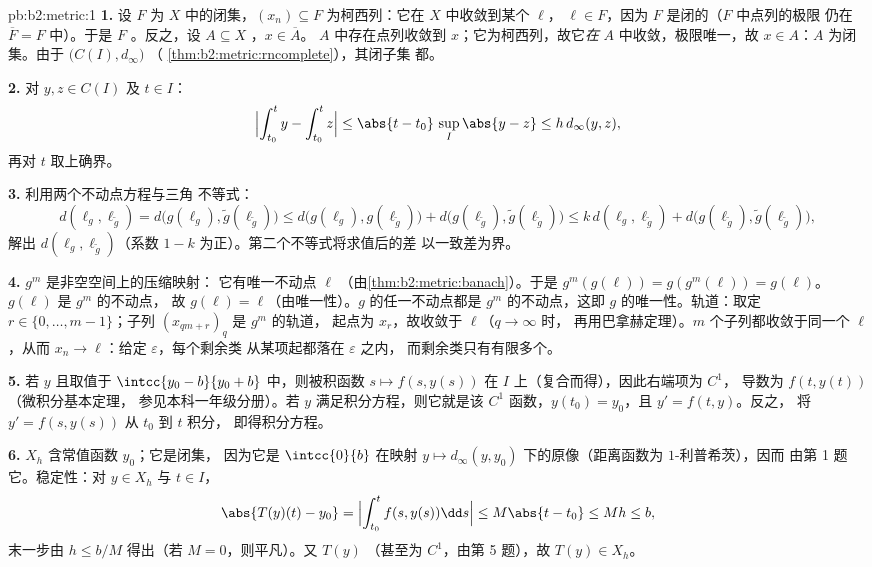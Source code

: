 \begin{solution}{pb:b2:metric:1}
\textbf{1.} 设 $F$ 为 $X$ 中的闭集，$(x_n)
\subseteq F$ 为柯西列：它在 $X$ 中收敛到某个 $\ell$，
$\ell \in F$，因为 $F$ 是闭的（$F$ 中点列的极限
仍在 $\overline F = F$ 中）。于是 $F$ 。反之，设 $A
\subseteq X$ ，$x \in \overline A$。
$A$ 中存在点列收敛到 $x$；它为柯西列，故它\emph{在}
$A$ 中收敛，极限唯一，故 $x \in A$：$A$ 为闭集。由于
$\bigl(C(I), d_\infty\bigr)$ （
\cref{thm:b2:metric:rncomplete}），其闭子集
都。

\textbf{2.} 对 $y, z \in C(I)$ 及 $t \in I$：
\[
\Bigl|\int_{t_0}^{t}y - \int_{t_0}^{t}z\Bigr| \leq
\abs{t - t_0}\,\sup_I\abs{y - z} \leq h\,d_\infty(y, z),
\]
再对 $t$ 取上确界。

\textbf{3.} 利用两个不动点方程与三角
不等式：
\[
d(\ell_g, \ell_{\widetilde g})
= d\bigl(g(\ell_g), \widetilde g(\ell_{\widetilde g})\bigr)
\leq d\bigl(g(\ell_g), g(\ell_{\widetilde g})\bigr) +
d\bigl(g(\ell_{\widetilde g}), \widetilde g(\ell_{\widetilde
g})\bigr)
\leq k\,d(\ell_g, \ell_{\widetilde g}) +
d\bigl(g(\ell_{\widetilde g}), \widetilde g(\ell_{\widetilde
g})\bigr),
\]
解出 $d(\ell_g, \ell_{\widetilde g})$（系数
$1 - k$ 为正）。第二个不等式将求值后的差
以一致差为界。

\textbf{4.} $g^m$ 是非空空间上的压缩映射：
它有唯一不动点 $\ell$
（由\cref{thm:b2:metric:banach}）。于是 $g^m(g(\ell)) =
g(g^m(\ell)) = g(\ell)$。$g(\ell)$ 是 $g^m$ 的不动点，
故 $g(\ell) = \ell$（由唯一性）。$g$ 的任一不动点都是
$g^m$ 的不动点，这即 $g$ 的唯一性。轨道：取定 $r \in \{0, \dots,
m-1\}$；子列 $(x_{qm + r})_q$ 是 $g^m$ 的轨道，
起点为 $x_r$，故收敛于 $\ell$（$q \to \infty$ 时，
再用巴拿赫定理）。$m$ 个子列都收敛于同一个
$\ell$，从而 $x_n \to \ell$：给定 $\varepsilon$，每个剩余类
从某项起都落在 $\varepsilon$ 之内，
而剩余类只有有限多个。

\textbf{5.} 若 $y$ 且取值于 $\intcc{y_0 -
b}{y_0 + b}$ 中，则被积函数 $s \mapsto f(s, y(s))$
在 $I$ 上（复合而得），因此右端项为 $C^1$，
导数为 $f(t, y(t))$（微积分基本定理，
参见本科一年级分册）。若 $y$ 满足积分方程，则它就是该
$C^1$ 函数，$y(t_0) = y_0$，且 $y' = f(t, y)$。反之，
将 $y' = f(s, y(s))$ 从 $t_0$ 到 $t$ 积分，
即得积分方程。

\textbf{6.} $X_h$ 含常值函数 $y_0$；它是闭集，
因为它是 $\intcc{0}{b}$ 在映射 $y
\mapsto d_\infty(y, y_0)$ 下的原像（距离函数为 $1$-利普希茨），因而
由第 1 题它。稳定性：对 $y \in X_h$ 与 $t \in
I$，
\[
\abs{T(y)(t) - y_0} = \Bigl|\int_{t_0}^{t}f(s, y(s))\dd s\Bigr|
\leq M\abs{t - t_0} \leq Mh \leq b ,
\]
末一步由 $h \leq b/M$ 得出（若 $M = 0$，则平凡）。又 $T(y)$
（甚至为 $C^1$，由第 5 题），故 $T(y) \in X_h$。


\end{solution}
